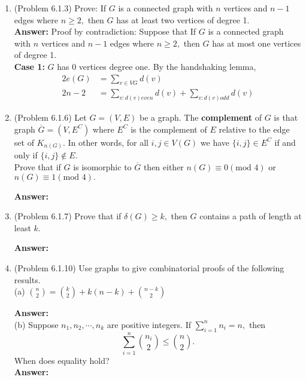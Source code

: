 \documentclass{amsart}
\begin{document}
\begin{enumerate}
\item (Problem 6.1.3) Prove: If $G$ is a connected graph with $n$ vertices and $n-1$ edges where $n \geq 2,$ then $G$ has at least two vertices of degree 1.\\

\textbf{Answer:} Proof by contradiction: Suppose that If $G$ is a connected graph with $n$ vertices and $n-1$ edges where $n \geq 2,$ then $G$ has at most one vertices of degree 1.\\
\textbf{Case 1:} $G$ has 0 vertices degree one. By the handshaking lemma,
\begin{align*}
2e(G) &= \sum_{v\in V{G}} d(v)\\
2n-2 &= \sum_{v : d(v) even} d(v) + \sum_{v : d(v) odd} d(v)
\end{align*}

	\vspace{1in}

\item (Problem 6.1.6) Let $G=(V,E)$ be a graph. The \textbf{complement} of $G$ is that graph $\overline{G}=(V,E^C)$ where $E^C$ is the complement of $E$ relative to the edge set of $K_{n(G)}.$ In other words, for all $i,j \in V(G)$ we have $\{i,j\} \in E^C$ if and only if $\{i,j\} \not \in E.$\\

Prove that if $G$ is isomorphic to $\overline{G}$ then either $n(G) \equiv 0 (\text{mod } 4)$ or $n(G) \equiv 1 (\text{mod } 4).$

\textbf{Answer:}\\

	\vspace{1in}
	
\item (Problem 6.1.7) Prove that if $\delta(G) \geq k,$ then $G$ contains a path of length at least $k.$

\textbf{Answer:}\\

	\vspace{1in}

\item (Problem 6.1.10) Use graphs to give combinatorial proofs of the following results.\\
(a) $\displaystyle{{n \choose 2} = {k \choose 2} + k(n-k) +{{n-k} \choose 2}}$

\textbf{Answer:}\\

	\vspace{1in}
(b) Suppose $n_1,n_2,\cdots,n_k$ are positive integers. If $\sum_{i=1}^n n_i=n,$ then 
$$\sum_{i=1}^n {n_i \choose 2} \leq {n \choose 2}.$$
When does equality hold?\\

\textbf{Answer:}\\


\end{enumerate}
\end{document}
